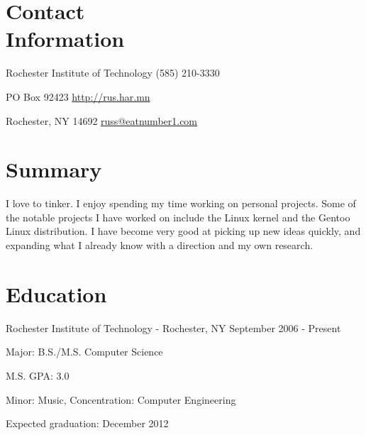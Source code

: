 \documentclass[a4paper,margin,line]{resume}
\newcommand{\rdate}[1]{\hfill {\small #1}}
\begin{document}
\begin{resume}
\section{\mysidestyle Contact \\ Information} \vspace{2mm}
	\begin{asparablank}
		\item Rochester Institute of Technology \hfill (585) 210-3330
		\item PO Box 92423 \hfill \href{http://rus.har.mn/}{http://rus.har.mn}
		\item Rochester, NY 14692 \hfill \href{mailto:russ@eatnumber1.com}{russ@eatnumber1.com}
	\end{asparablank}


\section{\mysidestyle Summary}
	I love to tinker. I enjoy spending my time working on personal projects. Some of the notable projects I have worked on include the Linux kernel and the Gentoo Linux distribution.  I have become very good at picking up new ideas quickly, and expanding what I already know with a direction and my own research.

\section{\mysidestyle Education}
	\begin{compactdesc}
		\item[Rochester Institute of Technology] - Rochester, NY \rdate{September 2006 - Present}
		\begin{compactitem} { \small
			\item Major: B.S./M.S. Computer Science
			\item M.S. GPA: 3.0
			\item Minor: Music, Concentration: Computer Engineering
			\item Expected graduation: December 2012
		} \end{compactitem}
	\end{compactdesc}


\end{resume}
\end{document}
